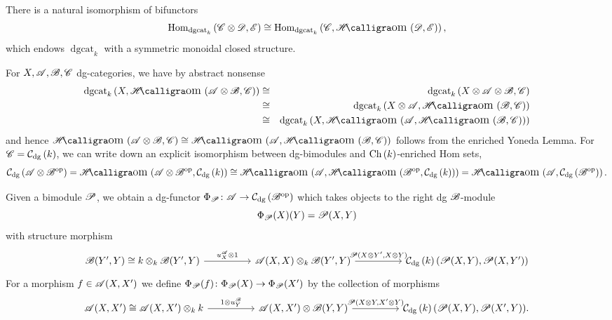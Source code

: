 \documentclass[dissertation.tex]{subfiles}
\begin{document}
\begin{rmk}
  There is a natural isomorphism of bifunctors
  $$\Hom{\operatorname{dgcat}_k}{\CC \otimes \D, \mathscr{E}} \cong \Hom{\operatorname{dgcat}_k}{\CC, \SHom{\D,\mathscr{E}}},$$
  which endows $\operatorname{dgcat}_k$ with a symmetric monoidal closed structure.

  For $X,\mathscr{A}, \mathscr{B}, \mathscr{C}$ dg-categories, we have by abstract nonsense
  \begin{eqnarray*}
    \dgcat_k\left(X, \SHom{\A \otimes \B, \CC}\right) &\cong& \dgcat_k\left(X \otimes \A \otimes \B, \CC\right)\\
    &\cong& \dgcat_k\left(X \otimes \A, \SHom{\B, \CC}\right)\\
    &\cong& \dgcat_k\left(X, \SHom{\A,\SHom{\B, \CC}}\right)
  \end{eqnarray*}
  and hence $\SHom{\A \otimes \B, \CC} \cong \SHom{\A, \SHom{\B, \CC}}$ follows from the enriched Yoneda Lemma.
  For $\mathscr{C} = \mathcal{C}_\text{dg}\left(k\right)$, we can write down an explicit isomorphism between dg-bimodules and $\operatorname{Ch}\left(k\right)$-enriched Hom sets,
  $$\cdg{\A \otimes \B^\text{op}} = \SHom{\A \otimes \B^\text{op}, \cdg{k}} \cong \SHom{\A, \SHom{\B^\op, \cdg{k}}} = \SHom{\A,\cdg{\B^\op}}.$$
  
  Given a bimodule $\mathscr{P}$, we obtain a dg-functor $\Phi_{\mathscr{P}} \colon \mathscr{A} \to \mathcal{C}_\text{dg}\left(\mathscr{B}^\text{op}\right)$ which takes objects to the right dg $\mathscr{B}$-module 
  $$\Phi_{\mathscr{P}}(X)(Y) = \mathscr{P}(X,Y)$$
  with structure morphism
  $$\begin{tikzcd}
    \B(Y^\prime, Y) \cong k \otimes_k \B(Y^\prime, Y) \arrow{rr}{u^\A_X \otimes 1} && 
    \A(X,X) \otimes_k \B(Y^\prime, Y) \arrow{rr}{\funct{P}(X \otimes Y^\prime, X \otimes Y)} &&
    \cdg{k}(\funct{P}(X,Y), \funct{P}(X,Y^\prime))
  \end{tikzcd}$$
  For a morphism $f \in \mathscr{A}(X,X^\prime)$ we define $\Phi_{\mathscr{P}}(f) \colon \Phi_{\mathscr{P}}(X) \to \Phi_{\mathscr{P}}(X^\prime)$ by the collection of morphisms
  $$\begin{tikzcd}
    \A(X,X^\prime) \cong \A(X,X^\prime) \otimes_k k \arrow{rr}{1 \otimes u^\B_Y} && \A(X,X^\prime) \otimes \B(Y,Y) \arrow{rr}{\funct{P}(X \otimes Y, X^\prime \otimes Y)} && \cdg{k}(\funct{P}(X,Y), \funct{P}(X^\prime, Y)).
  \end{tikzcd}$$


\end{rmk}
\end{document}
